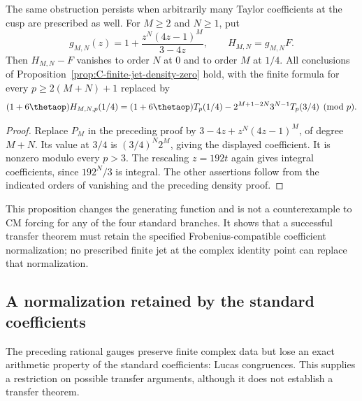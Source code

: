 \begin{corollary}\label{cor:C-two-jet-density-zero}
The same obstruction persists when arbitrarily many Taylor
coefficients at the cusp are prescribed as well.  For $M\ge2$ and
$N\ge1$, put
\[
 g_{M,N}(z)=1+\frac{z^N(4z-1)^M}{3-4z},\qquad
 H_{M,N}=g_{M,N}F.
\]
Then $H_{M,N}-F$ vanishes to order $N$ at $0$ and to order $M$
at $1/4$.  All conclusions of
Proposition~\ref{prop:C-finite-jet-density-zero} hold, with the
finite formula for every $p\ge2(M+N)+1$ replaced by
\[
 (1+6\thetaop)H_{M,N,p}(1/4)
 =(1+6\thetaop)T_p(1/4)
   -2^{M+1-2N}3^{N-1}T_p(3/4)\pmod p.
\]
\end{corollary}
\begin{proof}
Replace $P_M$ in the preceding proof by
$3-4z+z^N(4z-1)^M$, of degree $M+N$.
Its value at $3/4$ is $(3/4)^N2^M$, giving the displayed
coefficient.  It is nonzero modulo every $p>3$.
The rescaling $z=192t$ again gives integral coefficients, since
$192^N/3$ is integral.  The other assertions follow from the
indicated orders of vanishing and the preceding density proof.
\end{proof}

This proposition changes the generating function and is not a
counterexample to CM forcing for any of the four standard branches.
It shows that a successful transfer theorem must retain the specified
Frobenius-compatible coefficient normalization; no prescribed finite
jet at the complex identity point can replace that normalization.

\subsection{A normalization retained by the standard coefficients}
\label{subsec:C-canonical-lucas}

The preceding rational gauges preserve finite complex data but lose
an exact arithmetic property of the standard coefficients: Lucas
congruences. This supplies a restriction on possible transfer
arguments, although it does not establish a transfer theorem.

